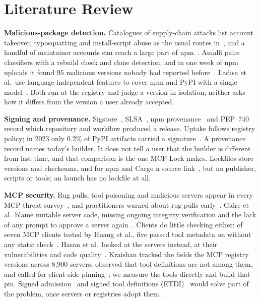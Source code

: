 \section{Literature Review}
\label{sec:lit}

\textbf{Malicious-package detection.} Catalogues of supply-chain attacks list account takeover, typosquatting and
install-script abuse as the usual routes in~\cite{ohm2020backstabber,ladisa2023sok}, and a handful of maintainer
accounts can reach a large part of npm~\cite{zimmermann2019small,zahan2022weak}. Amalfi pairs classifiers with a rebuild
check and clone detection, and in one week of npm uploads it found 95 malicious versions nobody had reported
before~\cite{sejfia2022amalfi}. Ladisa et al.\ use language-independent features to cover npm and PyPI with a single
model~\cite{ladisa2023crosslang}. Both run at the registry and judge a version in isolation; neither asks how it differs
from the version a user already accepted.

\textbf{Signing and provenance.} Sigstore~\cite{newman2022sigstore}, SLSA~\cite{slsa2023provenance}, npm
provenance~\cite{npmprovenance} and PEP~740~\cite{pep740} record which repository and workflow produced a release.
Uptake follows registry policy; in 2023 only 0.2\% of PyPI artifacts carried a signature~\cite{schorlemmer2024signing}.
A provenance record names today's builder. It does not tell a user that the builder is different from last time, and
that comparison is the one MCP-Lock makes. Lockfiles store versions and checksums, and for npm and Cargo a source
link~\cite{gamage2025lockfiles}, but no publisher, scripts or tools; an  launch has no lockfile at all.

\textbf{MCP security.} Rug pulls, tool poisoning and malicious servers appear in every MCP threat
survey~\cite{hou2025mcp,zhao2025attack,gaire2025sok}, and practitioners warned about rug pulls
early~\cite{invariant2025poisoning}. Gaire et al.\ blame mutable server code, missing ongoing integrity verification
and the lack of any prompt to approve a server again~\cite{gaire2025sok}. Clients do little checking either: of seven
MCP clients tested by Huang et al., five passed tool metadata on without any static check~\cite{huang2026toolpoison}.
Hasan et al.\ looked at the servers instead, at their vulnerabilities and code quality~\cite{hasan2025glance}. Kraishan tracked the fields the MCP registry
versions across 8,900 servers, observed that tool definitions are not among them, and called for client-side
pinning~\cite{kraishan2026drift}; we measure the tools directly and build that pin. Signed admission~\cite{metere2026attested}
and signed tool definitions (ETDI)~\cite{bhatt2025etdi} would solve part of the problem, once servers or registries adopt
them.

